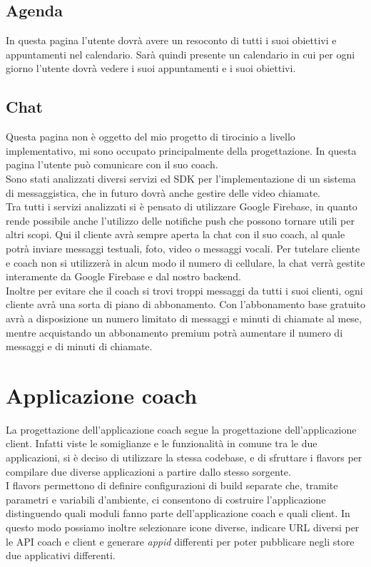 \subsection{Agenda}
In questa pagina l'utente dovrà avere un resoconto di tutti i suoi obiettivi e appuntamenti nel calendario. Sarà quindi presente un calendario in cui per ogni giorno l'utente dovrà vedere i suoi appuntamenti e i suoi obiettivi.
\subsection{Chat}
Questa pagina non è oggetto del mio progetto di tirocinio a livello implementativo, mi sono occupato principalmente della progettazione.
In questa pagina l'utente può comunicare con il suo coach.\\
Sono stati analizzati diversi servizi ed \gls{SDK} per l'implementazione di un sistema di messaggistica, che in futuro dovrà anche gestire delle video chiamate.\\
Tra tutti i servizi analizzati si è pensato di utilizzare Google Firebase, in quanto rende possibile anche l'utilizzo delle notifiche push che possono tornare utili per altri scopi.
Qui il cliente avrà sempre aperta la chat con il suo coach, al quale potrà inviare messaggi testuali, foto, video o messaggi vocali. Per tutelare cliente e coach non si utilizzerà in alcun modo il numero di cellulare, la chat verrà gestite interamente da Google Firebase e dal nostro backend.\\
Inoltre per evitare che il coach si trovi troppi messaggi da tutti i suoi clienti, ogni cliente avrà una sorta di piano di abbonamento. Con l'abbonamento base gratuito avrà a disposizione un numero limitato di messaggi e minuti di chiamate al mese, mentre acquistando un abbonamento premium potrà aumentare il numero di messaggi e di minuti di chiamate.
\section{Applicazione coach}
La progettazione dell'applicazione coach segue la progettazione dell'applicazione client. Infatti viste le somiglianze e le funzionalità in comune tra le due applicazioni, si è deciso di utilizzare la stessa \gls{codebase}, e di sfruttare i flavors per compilare due diverse applicazioni a partire dallo stesso sorgente.\\
I flavors permettono di definire configurazioni di build separate che, tramite parametri e variabili d’ambiente, ci consentono di costruire l’applicazione distinguendo quali moduli fanno parte dell’applicazione coach e quali client. In questo modo possiamo inoltre selezionare icone diverse, indicare URL diversi per le API coach e client e generare \textit{appid} differenti per poter pubblicare negli store due applicativi differenti.
